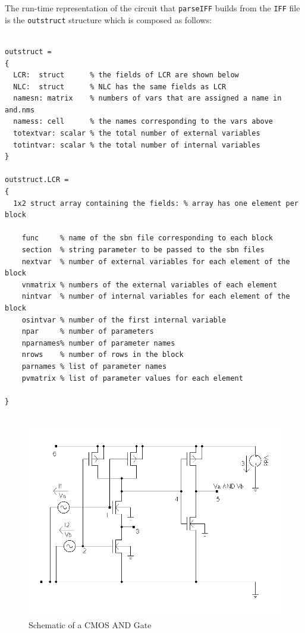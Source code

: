 \documentclass{scrartcl}
\newcommand{\Iff}{{\tt IFF}}
\begin{document}
The run-time representation of the circuit that {\tt parseIFF} builds
from the {\Iff} file is the {\tt outstruct} structure which is composed as follows:
\begin{lstlisting}

outstruct =
{
  LCR:  struct      % the fields of LCR are shown below
  NLC:  struct      % NLC has the same fields as LCR
  namesn: matrix    % numbers of vars that are assigned a name in and.nms
  namess: cell      % the names corresponding to the vars above
  totextvar: scalar % the total number of external variables
  totintvar: scalar % the total number of internal variables
}

outstruct.LCR =
{
  1x2 struct array containing the fields: % array has one element per block

    func     % name of the sbn file corresponding to each block
    section  % string parameter to be passed to the sbn files
    nextvar  % number of external variables for each element of the block
    vnmatrix % numbers of the external variables of each element
    nintvar  % number of internal variables for each element of the block
    osintvar % number of the first internal variable
    npar     % number of parameters
    nparnames% number of parameter names
    nrows    % number of rows in the block
    parnames % list of parameter names
    pvmatrix % list of parameter values for each element

}


\end{lstlisting}



\begin{figure}
\begin{center}
\includegraphics[width=.99\linewidth]{AND_BW.png}
\end{center}
\caption{Schematic of a CMOS AND Gate}\label{fig:and}
\end{figure}
\end{document}

